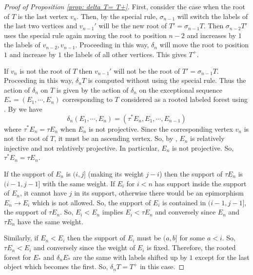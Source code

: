 \documentclass[11pt]{amsart}
\theoremstyle{definition}
\theoremstyle{remark}
\numberwithin{equation}{section}
\begin{document}
\begin{proof}[Proof of Proposition \ref{prop: delta T= T+}]
First, consider the case when the root of $T$ is the last vertex $v_n$.  Then, by the special rule, $\sigma_{n-1}$ will switch the labels of the last two vertices and $v_{n-1}'$ will be the new root of $T'=\sigma_{n-1}T$. Then $\sigma_{n-2}T'$ uses the special rule again moving the root to position $n-2$ and increases by $1$ the labels of $v_{n-2},v_{n-1}$. Proceeding in this way, $\delta_n$ will move the root to position $1$ and increase by $1$ the labels of all other vertices. This gives $T^+$.


If $v_n$ is not the root of $T$ then $v_{n-1}'$ will not be the root of $T'=\sigma_{n-1}T$. Proceeding in this way, $\delta_nT$ is computed without using the special rule. Thus the action of $\delta_n$ on $T$ is given by the action of $\delta_n$ on the exceptional sequence $E_\ast=(E_1,\cdots,E_n)$ corresponding to $T$ considered as a rooted labeled forest using \cite{Ig-Sen}. By \cite[Theorem 4.5]{Ig-Sen} we have
\[
	\delta_n(E_1,\cdots,E_n)=(\tau^\ast E_n,E_1,\cdots,E_{n-1})
\]
where $\tau^\ast E_n=\tau E_n$ when $E_n$ is not projective. Since the corresponding vertex $v_n$ is not the root of $T$, it must be an ascending vertex. So, by \cite{Ig-Sen}, $E_n$ is relatively injective and not relatively projective. In particular, $E_n$ is not projective. So, $\tau^\ast E_n=\tau E_n$.

If the support of $E_n$ is $(i,j]$ (making its weight $j-i$) then the support of $\tau E_n$ is $(i-1,j-1]$ with the same weight. If $E_i$ for $i<n$ has support inside the support of $E_n$, it cannot have $j$ in its support, otherwise there would be an epimorphism $E_n\to E_i$ which is not allowed. So, the support of $E_i$ is contained in $(i-1,j-1]$, the support of $\tau E_n$. So, $E_i<E_n$ implies $E_i<\tau E_n$ and conversely since $E_n$ and $\tau E_n$ have the same weight.

Similarly, if $E_n<E_i$ then the support of $E_i$ must be $(a,b]$ for some $a<i$. So, $\tau E_n<E_i$ and conversely since the weight of $E_i$ is fixed. Therefore, the rooted forest for $E_\ast$ and $\delta_nE_\ast$ are the same with labels shifted up by $1$ except for the last object which becomes the first. So, $\delta_nT=T^+$ in this case.
\end{proof}
\end{document}
